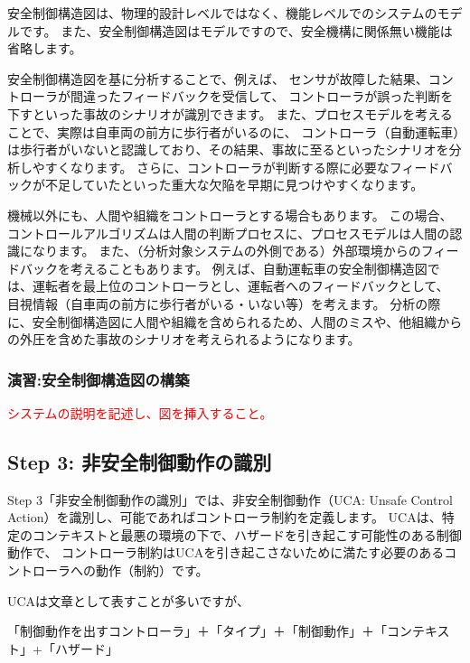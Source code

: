 安全制御構造図は、物理的設計レベルではなく、機能レベルでのシステムのモデルです。
また、安全制御構造図はモデルですので、安全機構に関係無い機能は省略します。

安全制御構造図を基に分析することで、例えば、
センサが故障した結果、コントローラが間違ったフィードバックを受信して、
コントローラが誤った判断を下すといった事故のシナリオが識別できます。
また、プロセスモデルを考えることで、実際は自車両の前方に歩行者がいるのに、
コントローラ（自動運転車）は歩行者がいないと認識しており、その結果、事故に至るといったシナリオを分析しやすくなります。
さらに、コントローラが判断する際に必要なフィードバックが不足していたといった重大な欠陥を早期に見つけやすくなります。

機械以外にも、人間や組織をコントローラとする場合もあります。
この場合、コントロールアルゴリズムは人間の判断プロセスに、プロセスモデルは人間の認識になります。
また、（分析対象システムの外側である）外部環境からのフィードバックを考えることもあります。
例えば、自動運転車の安全制御構造図では、運転者を最上位のコントローラとし、運転者へのフィードバックとして、
目視情報（自車両の前方に歩行者がいる・いない等）を考えます。
分析の際に、安全制御構造図に人間や組織を含められるため、人間のミスや、他組織からの外圧を含めた事故のシナリオを考えられるようになります。

\subsubsection{演習:安全制御構造図の構築} %

\textcolor{red}{システムの説明を記述し、図を挿入すること。}


\subsection{Step 3: 非安全制御動作の識別}

Step 3「非安全制御動作の識別」では、非安全制御動作（UCA: Unsafe Control Action）を識別し、可能であればコントローラ制約を定義します。
UCAは、特定のコンテキストと最悪の環境の下で、ハザードを引き起こす可能性のある制御動作で、
コントローラ制約はUCAを引き起こさないために満たす必要のあるコントローラへの動作（制約）です。

UCAは文章として表すことが多いですが、

「制御動作を出すコントローラ」＋「タイプ」＋「制御動作」＋「コンテキスト」+「ハザード」

